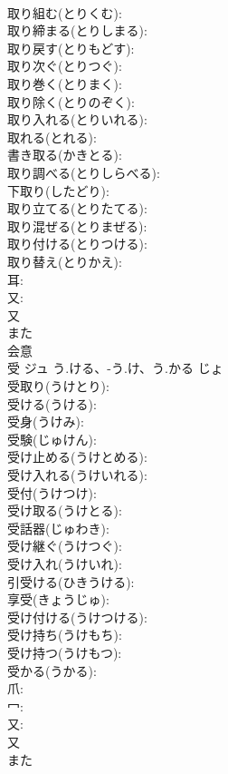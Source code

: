 \documentclass[8pt]{extreport}
\begin{document}
\begin{CJK}{UTF8}{min}
\\	取り組む(とりくむ): 
\\	取り締まる(とりしまる): 
\\	取り戻す(とりもどす): 
\\	取り次ぐ(とりつぐ): 
\\	取り巻く(とりまく): 
\\	取り除く(とりのぞく): 
\\	取り入れる(とりいれる): 
\\	取れる(とれる): 
\\	書き取る(かきとる): 
\\	取り調べる(とりしらべる): 
\\	下取り(したどり): 
\\	取り立てる(とりたてる): 
\\	取り混ぜる(とりまぜる): 
\\	取り付ける(とりつける): 
\\	取り替え(とりかえ): 
\\	耳: 
\\	又: 
\\	又	
\\	また	
\\	会意 
\\	受	ジュ	う.ける、-う.け、う.かる	じょ	
\\	受取り(うけとり): 
\\	受ける(うける): 
\\	受身(うけみ): 
\\	受験(じゅけん): 
\\	受け止める(うけとめる): 
\\	受け入れる(うけいれる): 
\\	受付(うけつけ): 
\\	受け取る(うけとる): 
\\	受話器(じゅわき): 
\\	受け継ぐ(うけつぐ): 
\\	受け入れ(うけいれ): 
\\	引受ける(ひきうける): 
\\	享受(きょうじゅ): 
\\	受け付ける(うけつける): 
\\	受け持ち(うけもち): 
\\	受け持つ(うけもつ): 
\\	受かる(うかる): 
\\	爪: 
\\	冖: 
\\	又: 
\\	又	
\\	また	

\end{CJK}
\end{document}
